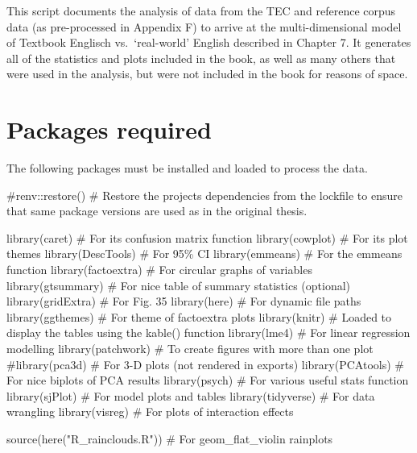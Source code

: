 \documentclass[
  letterpaper,
  DIV=11,
  numbers=noendperiod]{scrreprt}
\newenvironment{Shaded}{\begin{snugshade}}{\end{snugshade}}
\newcommand{\CommentTok}[1]{\textcolor[rgb]{0.37,0.37,0.37}{#1}}
\newcommand{\FunctionTok}[1]{\textcolor[rgb]{0.28,0.35,0.67}{#1}}
\newcommand{\NormalTok}[1]{\textcolor[rgb]{0.00,0.23,0.31}{#1}}
\newcommand{\StringTok}[1]{\textcolor[rgb]{0.13,0.47,0.30}{#1}}
\begin{document}
This script documents the analysis of data from the TEC and reference
corpus data (as pre-processed in Appendix F) to arrive at the
multi-dimensional model of Textbook Englisch vs.~`real-world' English
described in Chapter 7. It generates all of the statistics and plots
included in the book, as well as many others that were used in the
analysis, but were not included in the book for reasons of space.

\section{Packages required}\label{packages-required-3}

The following packages must be installed and loaded to process the data.

\begin{Shaded}
\begin{Highlighting}[]
\CommentTok{\#renv::restore() \# Restore the project\textquotesingle{}s dependencies from the lockfile to ensure that same package versions are used as in the original thesis.}

\FunctionTok{library}\NormalTok{(caret) }\CommentTok{\# For its confusion matrix function}
\FunctionTok{library}\NormalTok{(cowplot) }\CommentTok{\# For its plot themes}
\FunctionTok{library}\NormalTok{(DescTools) }\CommentTok{\# For 95\% CI}
\FunctionTok{library}\NormalTok{(emmeans) }\CommentTok{\# For the emmeans function}
\FunctionTok{library}\NormalTok{(factoextra) }\CommentTok{\# For circular graphs of variables}
\FunctionTok{library}\NormalTok{(gtsummary) }\CommentTok{\# For nice table of summary statistics (optional)}
\FunctionTok{library}\NormalTok{(gridExtra) }\CommentTok{\# For Fig. 35}
\FunctionTok{library}\NormalTok{(here) }\CommentTok{\# For dynamic file paths}
\FunctionTok{library}\NormalTok{(ggthemes) }\CommentTok{\# For theme of factoextra plots}
\FunctionTok{library}\NormalTok{(knitr) }\CommentTok{\# Loaded to display the tables using the kable() function}
\FunctionTok{library}\NormalTok{(lme4) }\CommentTok{\# For linear regression modelling}
\FunctionTok{library}\NormalTok{(patchwork) }\CommentTok{\# To create figures with more than one plot}
\CommentTok{\#library(pca3d) \# For 3{-}D plots (not rendered in exports)}
\FunctionTok{library}\NormalTok{(PCAtools) }\CommentTok{\# For nice biplots of PCA results}
\FunctionTok{library}\NormalTok{(psych) }\CommentTok{\# For various useful stats function}
\FunctionTok{library}\NormalTok{(sjPlot) }\CommentTok{\# For model plots and tables}
\FunctionTok{library}\NormalTok{(tidyverse) }\CommentTok{\# For data wrangling}
\FunctionTok{library}\NormalTok{(visreg) }\CommentTok{\# For plots of interaction effects}

\FunctionTok{source}\NormalTok{(}\FunctionTok{here}\NormalTok{(}\StringTok{"R\_rainclouds.R"}\NormalTok{)) }\CommentTok{\# For geom\_flat\_violin rainplots}
\end{Highlighting}
\end{Shaded}
\end{document}
